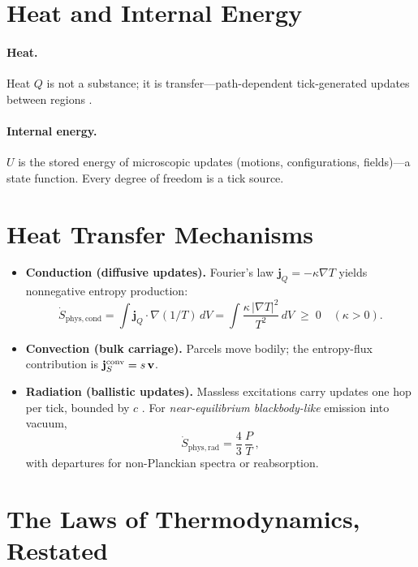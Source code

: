 \documentclass[11pt,oneside]{article}
\begin{document}
\section{Heat and Internal Energy}

\paragraph{Heat.}
Heat \(Q\) is not a substance; it is transfer—path-dependent tick-generated updates between regions \cite{callen1985thermodynamics}.

\paragraph{Internal energy.}
\(U\) is the stored energy of microscopic updates (motions, configurations, fields)—a state function. Every degree of freedom is a tick source.

\section{Heat Transfer Mechanisms}

\begin{itemize}
  \item \textbf{Conduction (diffusive updates).}
  Fourier’s law \(\mathbf j_Q=-\kappa\nabla T\) yields nonnegative entropy production:
  \[
    \dot{S}_{\mathrm{phys,cond}}=\int \mathbf j_Q\!\cdot\nabla(1/T)\,dV
    = \int \frac{\kappa\,|\nabla T|^2}{T^2}\,dV \;\ge\; 0\quad(\kappa>0).
  \]
  \item \textbf{Convection (bulk carriage).}
  Parcels move bodily; the entropy-flux contribution is \( \mathbf j_S^{\rm conv} = s\,\mathbf v \).
  \item \textbf{Radiation (ballistic updates).}
  Massless excitations carry updates one hop per tick, bounded by \(c\) \cite{einstein1905elektrodynamik,planck1901law}.
  For \emph{near-equilibrium blackbody-like} emission into vacuum,
  \[
    \dot{S}_{\mathrm{phys,rad}}=\frac{4}{3}\,\frac{P}{T}\,,
  \]
  with departures for non-Planckian spectra or reabsorption.
\end{itemize}

\section{The Laws of Thermodynamics, Restated}
\end{document}
